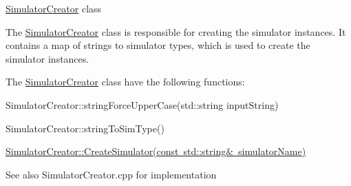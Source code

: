 \mbox{\hyperlink{classSimulatorCreator}{Simulator\+Creator}} class

The \mbox{\hyperlink{classSimulatorCreator}{Simulator\+Creator}} class is responsible for creating the simulator instances. It contains a map of strings to simulator types, which is used to create the simulator instances.

The \mbox{\hyperlink{classSimulatorCreator}{Simulator\+Creator}} class have the following functions\+:

\begin{DoxyItemize}
\item Simulator\+Creator\+::string\+Force\+Upper\+Case(std\+::string input\+String) \item Simulator\+Creator\+::string\+To\+Sim\+Type() \item \mbox{\hyperlink{classSimulatorCreator_a9b003abbe6be374ef2b7fac6b1e3f821}{Simulator\+Creator\+::\+Create\+Simulator(const std\+::string\& simulator\+Name)}}\end{DoxyItemize}
\begin{DoxySeeAlso}{See also}
Simulator\+Creator.\+cpp for implementation 
\end{DoxySeeAlso}

